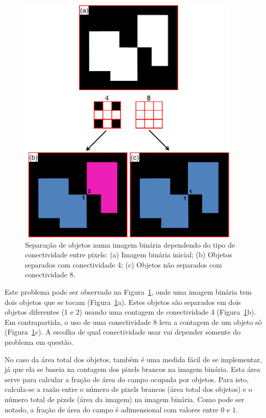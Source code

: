 \begin{figure} [h]
  \begin{center}
    \includegraphics[height=342pt,width=300pt]{images/fig_v4-v8}
    \caption{Separação de objetos numa imagem binária dependendo do
      tipo de conectividade entre pixels: (a) Imagem binária inicial;
      (b) Objetos separados com conectividade 4; (c) Objetos não
      separados com conectividade 8.\cite{115}}\label{fig:v4-v8}
  \end{center}
\end{figure}

Este problema pode ser observado na Figura~\ref{fig:v4-v8}, onde uma
imagem binária tem dois objetos que se tocam
(Figura~\ref{fig:v4-v8}a). Estes objetos são separados em dois objetos
diferentes ($1$ e $2$) usando uma contagem de conectividade 4
(Figura~\ref{fig:v4-v8}b). Em contrapartida, o uso de uma
conectividade 8 leva a contagem de um objeto só
(Figura~\ref{fig:v4-v8}c). A escolha de qual conectividade usar vai
depender somente do problema em questão.
 
No caso da área total dos objetos, também é uma medida fácil de se
implementar, já que ela se baseia na contagem dos pixels brancos na
imagem binária. Esta área serve para calcular a fração de área do
campo ocupada por objetos. Para isto, calcula-se a razão entre o
número de pixels brancos (área total dos objetos) e o número total de
pixels (área da imagem) na imagem binária. Como pode ser notado, a
fração de área do campo é adimensional com valores entre $0$ e $1$.

